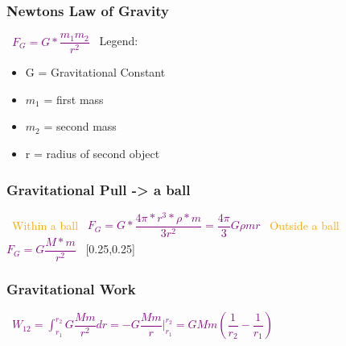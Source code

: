\documentclass[main.tex,fontsize=8pt,paper=a4,paper=portrait,DIV=calc,]{scrartcl}
\begin{document}
\begin{multicols*}{2}
\subsubsection{Newtons Law of Gravity}
\, \newline
\large \textcolor{purple}{\( F_G = G * \dfrac{m_1m_2}{r^2} \)}\newline
\, \newline
\normalsize Legend: \newline
\begin{itemize}
\item G = Gravitational Constant
\item \(m_1\) = first mass
\item \(m_2\) = second mass
\item r = radius of second object 
\end{itemize} 


\subsubsection{Gravitational Pull -> a ball}
\, \newline
\textcolor{orange}{Within a ball}\newline
\, \newline
\large \textcolor{purple}{\( F_G = G * \dfrac{4 \pi * r^3 * \rho * m}{3r^2} = \dfrac{4 \pi}{3}G \rho m r \)}\newline
\, \newline
\textcolor{orange}{Outside a ball}\newline
\, \newline
\large \textcolor{purple}{\( F_G = G \dfrac{M * m}{r^2} \)}\newline
\, \newline
\normalsize 
{}[0.25,0.25]

\subsubsection{Gravitational Work}
\, \newline
\large \textcolor{purple}{\( W_{12} = \int_{r_1}^{r_2} G \dfrac{Mm}{r^2}dr = -G\dfrac{Mm}{r}|^{r_2}_{r_1} = GMm\left( \dfrac{1}{r_2} - \dfrac{1}{r_1} \right) \)}\newline
\, \newline
\normalsize


\end{multicols*}
\end{document}
